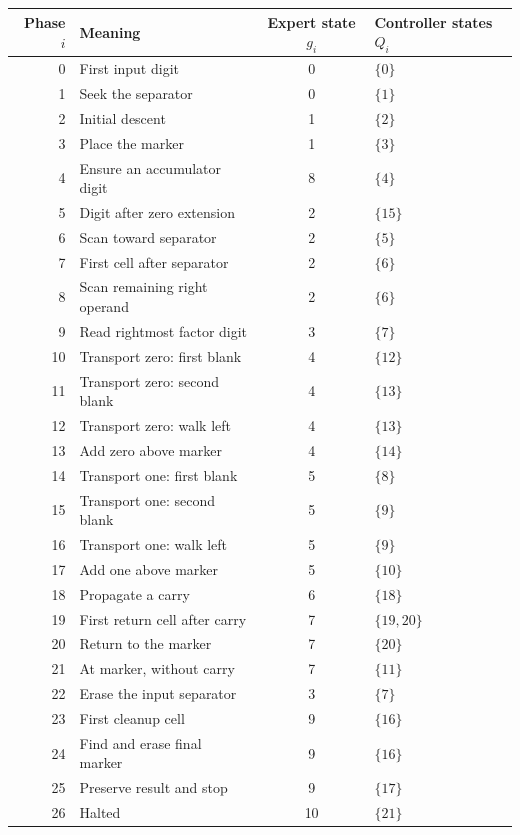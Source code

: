 \documentclass[11pt,a4paper]{article}
\begin{document}
\begin{center}
\small\renewcommand{\arraystretch}{1.18}
\begin{tabular}{r l c l}
\toprule
\rowcolor{Pale}Phase $i$ & Meaning & Expert state $g_i$ & Controller states $Q_i$\\
\midrule
0 & First input digit & 0 & $\{0\}$ \\
1 & Seek the separator & 0 & $\{1\}$ \\
2 & Initial descent & 1 & $\{2\}$ \\
3 & Place the marker & 1 & $\{3\}$ \\
4 & Ensure an accumulator digit & 8 & $\{4\}$ \\
5 & Digit after zero extension & 2 & $\{15\}$ \\
6 & Scan toward separator & 2 & $\{5\}$ \\
7 & First cell after separator & 2 & $\{6\}$ \\
8 & Scan remaining right operand & 2 & $\{6\}$ \\
9 & Read rightmost factor digit & 3 & $\{7\}$ \\
10 & Transport zero: first blank & 4 & $\{12\}$ \\
11 & Transport zero: second blank & 4 & $\{13\}$ \\
12 & Transport zero: walk left & 4 & $\{13\}$ \\
13 & Add zero above marker & 4 & $\{14\}$ \\
14 & Transport one: first blank & 5 & $\{8\}$ \\
15 & Transport one: second blank & 5 & $\{9\}$ \\
16 & Transport one: walk left & 5 & $\{9\}$ \\
17 & Add one above marker & 5 & $\{10\}$ \\
18 & Propagate a carry & 6 & $\{18\}$ \\
19 & First return cell after carry & 7 & $\{19,20\}$ \\
20 & Return to the marker & 7 & $\{20\}$ \\
21 & At marker, without carry & 7 & $\{11\}$ \\
22 & Erase the input separator & 3 & $\{7\}$ \\
23 & First cleanup cell & 9 & $\{16\}$ \\
24 & Find and erase final marker & 9 & $\{16\}$ \\
25 & Preserve result and stop & 9 & $\{17\}$ \\
26 & Halted & 10 & $\{21\}$ \\
\bottomrule
\end{tabular}
\end{center}
\end{document}
